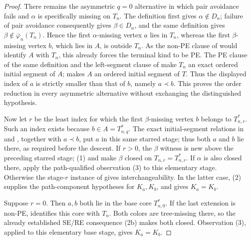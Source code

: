 \begin{proof}
There remains the asymmetric $q=0$ alternative in which pair avoidance
fails and $\alpha$ is specifically missing on $T_n$.  The definition
 first gives $\alpha\notin D_n$; failure of
pair avoidance consequently gives $\beta\in D_n$, and the same
definition gives $\beta\notin\overline\varphi_n(T_n)$.  Hence the first
$\alpha$-missing vertex $a$ lies in $T_n$, whereas the first
$\beta$-missing vertex $b$, which lies in $A$, is outside $T_n$.  As
the non-PE clause of  would identify $A$ with
$T_n$, this already forces the terminal kind to be PE.  The PE clause of
the same definition and the left-segment clause of
 make $T_n$ an exact ordered initial segment
of $A$;  makes $A$ an ordered initial segment
of $T$.  Thus the displayed index of $a$ is strictly smaller than that
of $b$, namely $a\prec b$.  This proves the order reduction in every
asymmetric alternative without exchanging the distinguished hypothesis.

Now let $r$ be the least index for which the first $\beta$-missing
vertex $b$ belongs to $T_{n,r}^{*}$.  Such an index exists because
$b\in A=T_{n,q}^{*}$.  The exact initial-segment relations in
 and
, together with $a\prec b$, put $a$
in this same starred stage; thus both $a$ and $b$ lie there, as required
before the descent.  If $r>0$, the $\beta$ witness is new above the
preceding starred stage; (1) and
 make $\beta$ closed on
$T_{n,r}=T_{n,r}^{*}$.  If $\alpha$ is also closed there, apply the
path-qualified observation (3) to this elementary stage.  Otherwise the
stage-$r$ instance of  gives interchangeability.  In the
latter case, (2) supplies the path-component hypotheses for $K_a,K_b$,
and  gives $K_a=K_b$.

Suppose $r=0$.  Then $a,b$ both lie in the base core
$T_{n,0}^{*}$.  If the last extension is non-PE,
 identifies this core with $T_n$.  Both colors
are tree-missing there, so the already established SE/RE consequence
(2b) makes both closed.  Observation (3), applied to this elementary
base stage, gives $K_a=K_b$.


\end{proof}
